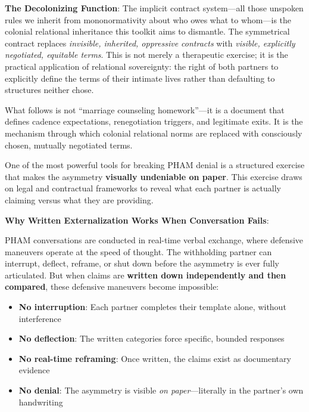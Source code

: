 \documentclass[12pt, letterpaper]{article}
\begin{document}
\vspace{1em}

\textbf{The Decolonizing Function}: The implicit contract system---all those unspoken rules we inherit from mononormativity about who owes what to whom---is the colonial relational inheritance this toolkit aims to dismantle. The symmetrical contract replaces \textit{invisible, inherited, oppressive contracts} with \textit{visible, explicitly negotiated, equitable terms}. This is not merely a therapeutic exercise; it is the practical application of relational sovereignty: the right of both partners to explicitly define the terms of their intimate lives rather than defaulting to structures neither chose.

What follows is not ``marriage counseling homework''---it is a document that defines cadence expectations, renegotiation triggers, and legitimate exits. It is the mechanism through which colonial relational norms are replaced with consciously chosen, mutually negotiated terms.

One of the most powerful tools for breaking PHAM denial is a structured exercise that makes the asymmetry \textbf{visually undeniable on paper}. This exercise draws on legal and contractual frameworks to reveal what each partner is actually claiming versus what they are providing.

\textbf{Why Written Externalization Works When Conversation Fails}:

PHAM conversations are conducted in real-time verbal exchange, where defensive maneuvers operate at the speed of thought. The withholding partner can interrupt, deflect, reframe, or shut down before the asymmetry is ever fully articulated. But when claims are \textbf{written down independently and then compared}, these defensive maneuvers become impossible:

\begin{itemize}
    \item \textbf{No interruption}: Each partner completes their template alone, without interference
    \item \textbf{No deflection}: The written categories force specific, bounded responses
    \item \textbf{No real-time reframing}: Once written, the claims exist as documentary evidence
    \item \textbf{No denial}: The asymmetry is visible \textit{on paper}---literally in the partner's own handwriting
\end{itemize}
\end{document}
